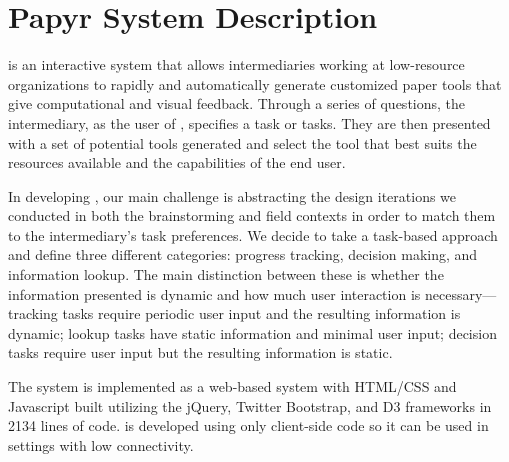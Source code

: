 \documentclass{sig-alternate}
\begin{document}
\section{Papyr System Description}
\label{sec:system-desc}

\nifty is an interactive system that allows intermediaries working at low-resource organizations to rapidly and automatically generate customized paper tools that give computational and visual feedback. Through a series of questions, the intermediary, as the user of \nifty, specifies a task or tasks. They are then presented with a set of potential tools generated and select the tool that best suits the resources available and the capabilities of the end user. 

In developing \nifty, our main challenge is abstracting the design iterations we conducted in both the brainstorming and field contexts in order to match them to the intermediary's task preferences. We decide to take a task-based approach and define three different categories: progress tracking, decision making, and information lookup. The main distinction between these is whether the information presented is dynamic and how much user interaction is necessary---tracking tasks require periodic user input and the resulting information is dynamic; lookup tasks have static information and minimal user input; decision tasks require user input but the resulting information is static.

The system is implemented as a web-based system with HTML/CSS and Javascript built utilizing the jQuery, Twitter Bootstrap, and D3 frameworks in 2134 lines of code. \nifty is developed using only client-side code so it can be used in settings with low connectivity.

\end{document}
